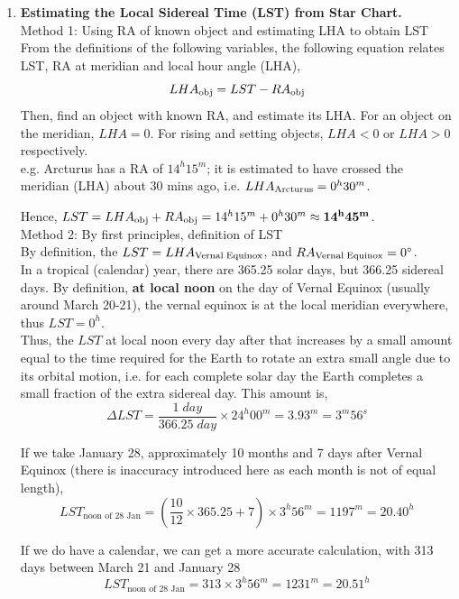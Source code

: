 \documentclass[a4paper,12pt]{extarticle}
\begin{document}
\begin{enumerate}
\item \textbf{Estimating the Local Sidereal Time (LST) from Star Chart.}\\ 

\textsf{Method 1: Using RA of known object and estimating LHA to obtain LST}\\

From the definitions of the following variables, the following equation relates LST, RA at meridian and local hour angle (LHA),
$$LHA_{\rm obj}=LST-RA_{\rm obj}$$
Then, find an object with known RA, and estimate its LHA. For an object on the meridian, $LHA = 0$. For rising and setting objects, $LHA < 0$ or $LHA > 0$ respectively.\\

e.g. Arcturus has a RA of $14^h15^m$; it is estimated to have crossed the meridian (LHA) about 30 mins ago, i.e. $LHA_{\rm Arcturus} = 0^h30^m$.

Hence, $LST=LHA_{\rm obj}+RA_{\rm obj}=14^h15^m+ 0^h30^m \approx \mathbf{14^h45^m}$.\\

\textsf{Method 2: By first principles, definition of LST}\\

By definition, the $LST = LHA_{\rm Vernal \;Equinox}$, and $RA_{\rm Vernal\; Equinox} = 0^\circ$.\\

In a tropical (calendar) year, there are 365.25 solar days, but 366.25 sidereal days. By definition, \textbf{at local noon} on the day of Vernal Equinox (usually around March 20-21), the vernal equinox is at the local meridian everywhere, thus $LST = 0^h$.\\

Thus, the $LST$ at local noon every day after that increases by a small amount equal to the time required for the Earth to rotate an extra small angle due to its orbital motion, i.e. for each complete solar day the Earth completes a small fraction of the extra sidereal day. This amount is,
$$\Delta LST=\frac{1\; day}{366.25\; day}\times 24^h00^m= 3.93^m=3^m56^s$$

If we take January 28, approximately 10 months and 7 days after Vernal Equinox (there is inaccuracy introduced here as each month is not of equal length),
$$LST_{\text{noon of 28 Jan}}=\left(\frac{10}{12}\times 365.25+7 \right)\times 3^h56^m= 1197^m=20.40^h$$

If we do have a calendar, we can get a more accurate calculation, with 313 days between March 21 and January 28
$$LST_{\text{noon of 28 Jan}}=313\times 3^h56^m=1231^m=20.51^h$$
 

\end{enumerate}
\end{document}
